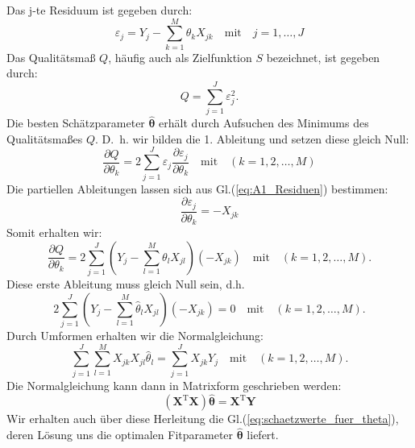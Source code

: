 Das j-te Residuum ist gegeben durch:
\begin{equation}
\varepsilon_j= Y_j - \sum_{k=1}^{M}\theta_k X_{jk} \quad \mathrm{mit}
\quad j=1,\ldots,J
\label{eq:A1_Residuen}
\end{equation}
Das Qualitätsmaß $Q$, häufig auch als Zielfunktion $S$ bezeichnet,
ist gegeben durch:
\begin{equation}
Q = \sum_{j=1}^J \varepsilon_j^2.
\end{equation}
Die besten Schätzparameter $\hat{\boldsymbol{\theta}}$
erhält durch Aufsuchen des Minimums des Qualitätsmaßes $Q$.
D.~h. wir bilden die 1. Ableitung und setzen diese gleich Null:
\begin{equation}
\frac{\partial Q}{\partial \theta_k} =2\sum_{j = 1}^J \varepsilon_j\frac{\partial \varepsilon_j}{\partial \theta_k} \quad \mathrm{mit} \quad (k=1,2,\ldots, M)
\end{equation}
Die partiellen Ableitungen lassen sich aus Gl.(\ref{eq:A1_Residuen}) bestimmen:
\begin{equation}
\frac{\partial \varepsilon_j}{\partial \theta_k}=-X_{jk}
\label{eq:partielleAblRegressoren}
\end{equation}
Somit erhalten wir:
\begin{equation}
\frac{\partial Q}{\partial \theta_k} = 2\sum_{j=1}^{J} \left( Y_j-\sum_{l=1}^{M} \theta_l X_{jl} \right) (-X_{jk})
\quad \mathrm{mit} \quad (k=1,2,\dots, M).
\end{equation}
Diese erste Ableitung muss gleich Null sein, d.h.
\begin{equation}
2\sum_{j=1}^{J} \left( Y_j-\sum_{l=1}^{M} \hat\theta_l X_{jl} \right) (-X_{jk})
= 0 \quad \mathrm{mit} \quad (k=1,2,\dots, M).
\end{equation}
Durch Umformen erhalten wir die \glqq Normalgleichung\grqq:
\begin{equation}
\sum_{j=1}^{J} \sum_{l=1}^{M} X_{jk} X_{jl} \hat\theta_l
= \sum_{j=1}^{J} X_{jk} Y_j \quad \mathrm{mit} \quad (k=1,2,\dots, M).
\end{equation}
Die Normalgleichung kann dann in Matrixform geschrieben werden:
\begin{equation}
(\mathbf X^\mathrm{T} \mathbf X) \hat{\boldsymbol{\theta}} = \mathbf X^\mathrm{T} \mathbf Y
\end{equation}
Wir erhalten auch über diese Herleitung die Gl.(\ref{eq:schaetzwerte_fuer_theta}),
deren Lösung uns die optimalen Fitparameter $\hat{\boldsymbol{\theta}}$ liefert.

